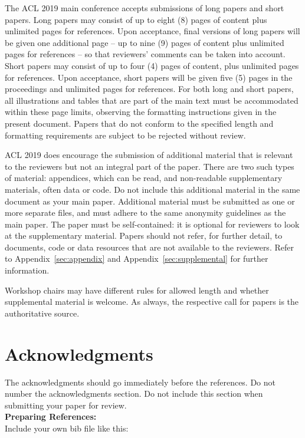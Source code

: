 \documentclass[11pt,a4paper]{article}
\begin{document}
The ACL 2019 main conference accepts submissions of long papers and
short papers.
 Long papers may consist of up to eight (8) pages of
content plus unlimited pages for references. Upon acceptance, final
versions of long papers will be given one additional page -- up to nine (9)
pages of content plus unlimited pages for references -- so that reviewers' comments
can be taken into account. Short papers may consist of up to four (4)
pages of content, plus unlimited pages for references. Upon
acceptance, short papers will be given five (5) pages in the
proceedings and unlimited pages for references. 
For both long and short papers, all illustrations and tables that are part
of the main text must be accommodated within these page limits, observing
the formatting instructions given in the present document. Papers that do not conform to the specified length and formatting requirements are subject to be rejected without review.

ACL 2019 does encourage the submission of additional material that is relevant to the reviewers but not an integral part of the paper. There are two such types of material: appendices, which can be read, and non-readable supplementary materials, often data or code.  Do not include this additional material in the same document as your main paper. Additional material must be submitted as one or more separate files, and must adhere to the same anonymity guidelines as the main paper. The paper must be self-contained: it is optional for reviewers to look at the supplementary material. Papers should not refer, for further detail, to documents, code or data resources that are not available to the reviewers. Refer to Appendix~\ref{sec:appendix} and Appendix~\ref{sec:supplemental} for further information. 

Workshop chairs may have different rules for allowed length and
whether supplemental material is welcome. As always, the respective
call for papers is the authoritative source.

\section*{Acknowledgments}

The acknowledgments should go immediately before the references.  Do
not number the acknowledgments section. Do not include this section
when submitting your paper for review. \\

\noindent \textbf{Preparing References:} \\
Include your own bib file like this:
\verb||
\verb|| 
\end{document}
